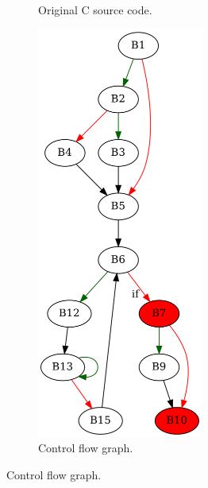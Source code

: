 \begin{figure}[htbp]
	\centering
	\begin{subfigure}[b]{0.30\textwidth}
		\centering
		
		\caption{Original C source code.}
	\end{subfigure}
	\begin{subfigure}[b]{0.50\textwidth}
		\centering
		\includegraphics[width=0.6\textwidth]{inc/appendices/examples/interval/example/sample/f_0004a.png}
		\caption{Control flow graph.}
	\end{subfigure}
\end{figure}


